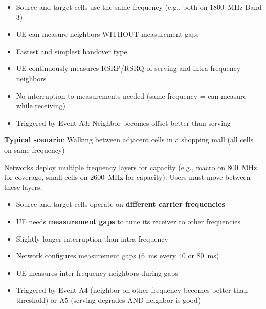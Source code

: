 \begin{itemize}
\tightlist
\item
  Source and target cells use the same frequency (e.g., both on 1800~MHz Band 3)
\item
  UE can measure neighbors WITHOUT measurement gaps
\item
  Fastest and simplest handover type
\end{itemize}


\begin{itemize}
\tightlist
\item
  UE continuously measures RSRP/\allowbreak{}RSRQ of serving and intra-frequency neighbors
\item
  No interruption to measurements needed (same frequency = can measure while receiving)
\item
  Triggered by Event A3: Neighbor becomes offset better than serving
\end{itemize}

\textbf{Typical scenario}: Walking between adjacent cells in a shopping mall (all cells on same frequency)



\CNchained{}

Networks deploy multiple frequency layers for capacity (e.g., macro on 800~MHz for coverage, small cells on 2600~MHz for capacity). Users must move between these layers.


\begin{itemize}
\tightlist
\item
  Source and target cells operate on \textbf{different carrier frequencies}
\item
  UE needs \textbf{measurement gaps} to tune its receiver to other frequencies
\item
  Slightly longer interruption than intra-frequency
\end{itemize}


\begin{itemize}
\tightlist
\item
  Network configures measurement gaps (6~ms every 40 or 80~ms)
\item
  UE measures inter-frequency neighbors during gaps
\item
  Triggered by Event A4 (neighbor on other frequency becomes better than threshold) or A5 (serving degrades AND neighbor is good)
\end{itemize}


